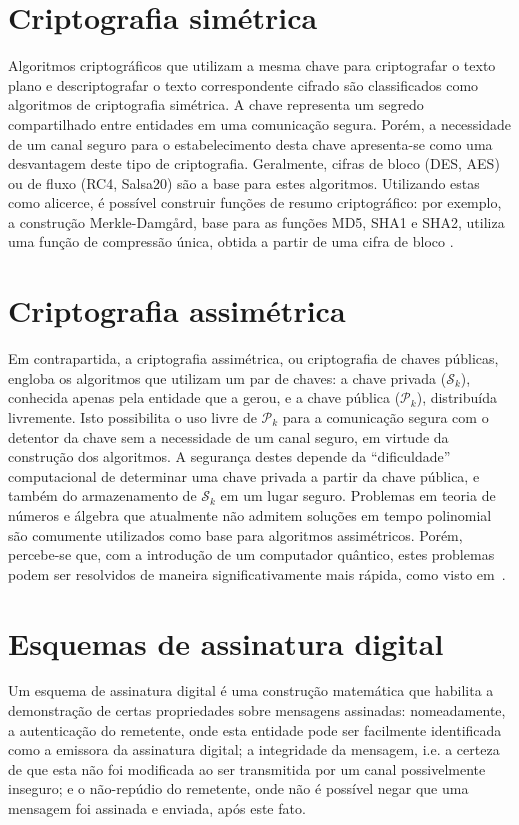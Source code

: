 \documentclass{article}
\newcommand{\pk}{$\mathcal{P}_k$}
\newcommand{\sk}{$\mathcal{S}_k$}
\begin{document}
\section{Criptografia simétrica}

Algoritmos criptográficos que utilizam a mesma chave para criptografar o
texto plano e descriptografar o texto correspondente cifrado são classificados
como algoritmos de criptografia simétrica. A chave representa um segredo
compartilhado entre entidades em uma comunicação segura. Porém, a necessidade
de um canal seguro para o estabelecimento desta chave apresenta-se como uma
desvantagem deste tipo de criptografia. Geralmente, cifras de bloco (DES, AES)
ou de fluxo (RC4, Salsa20) são a base para estes algoritmos. Utilizando estas
como alicerce, é possível construir funções de resumo criptográfico: por
exemplo, a construção Merkle-Damgård, base para as funções MD5, SHA1 e SHA2,
utiliza uma função de compressão única, obtida a partir de uma cifra de bloco
\cite[9.14]{Menezes:1996:HAC:548089}.

\section{Criptografia assimétrica}

Em contrapartida, a criptografia assimétrica, ou criptografia de chaves
públicas, engloba os algoritmos que utilizam um par de chaves: a chave privada
(\sk{}), conhecida apenas pela entidade que a gerou, e a chave pública (\pk{}),
distribuída livremente. Isto possibilita o uso livre de \pk{} para a
comunicação segura com o detentor da chave sem a necessidade de um canal
seguro, em virtude da construção dos algoritmos. A segurança destes depende da
``dificuldade'' computacional de determinar uma chave privada a partir da chave
pública, e também do armazenamento de \sk{} em um lugar seguro. Problemas em
teoria de números e álgebra que atualmente não admitem soluções em tempo
polinomial são comumente utilizados como base para algoritmos assimétricos.
Porém, percebe-se que, com a introdução de um computador quântico, estes
problemas podem ser resolvidos de maneira significativamente mais rápida, como
visto em~\cite{Shor:1997:PAP:264393.264406}.

\section{Esquemas de assinatura digital}

Um esquema de assinatura digital é uma construção matemática que habilita a
demonstração de certas propriedades sobre mensagens assinadas: nomeadamente,
a autenticação do remetente, onde esta entidade pode ser facilmente
identificada como a emissora da assinatura digital; a integridade da mensagem,
i.e. a certeza de que esta não foi modificada ao ser transmitida por um canal
possivelmente inseguro; e o não-repúdio do remetente, onde não é possível negar
que uma mensagem foi assinada e enviada, após este fato.
\end{document}

